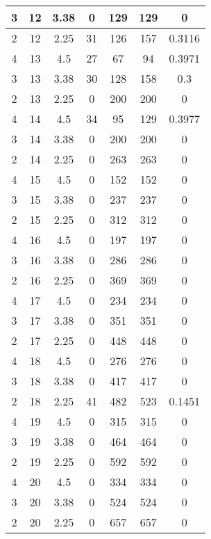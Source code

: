 \documentclass[letterpaper, 12pt]{article}
\begin{document}
\begin{longtable}{|c|c|c|c|c|c|c|}
\hline
3 & 12 & 3.38 & 0 & 129 & 129 & 0 \\
\hline
2 & 12 & 2.25 & 31 & 126 & 157 & 0.3116 \\
\hline
4 & 13 & 4.5 & 27 & 67 & 94 & 0.3971 \\
\hline
3 & 13 & 3.38 & 30 & 128 & 158 & 0.3 \\
\hline
2 & 13 & 2.25 & 0 & 200 & 200 & 0 \\
\hline
4 & 14 & 4.5 & 34 & 95 & 129 & 0.3977 \\
\hline
3 & 14 & 3.38 & 0 & 200 & 200 & 0 \\
\hline
2 & 14 & 2.25 & 0 & 263 & 263 & 0 \\
\hline
4 & 15 & 4.5 & 0 & 152 & 152 & 0 \\
\hline
3 & 15 & 3.38 & 0 & 237 & 237 & 0 \\
\hline
2 & 15 & 2.25 & 0 & 312 & 312 & 0 \\
\hline
4 & 16 & 4.5 & 0 & 197 & 197 & 0 \\
\hline
3 & 16 & 3.38 & 0 & 286 & 286 & 0 \\
\hline
2 & 16 & 2.25 & 0 & 369 & 369 & 0 \\
\hline
4 & 17 & 4.5 & 0 & 234 & 234 & 0 \\
\hline
3 & 17 & 3.38 & 0 & 351 & 351 & 0 \\
\hline
2 & 17 & 2.25 & 0 & 448 & 448 & 0 \\
\hline
4 & 18 & 4.5 & 0 & 276 & 276 & 0 \\
\hline
3 & 18 & 3.38 & 0 & 417 & 417 & 0 \\
\hline
2 & 18 & 2.25 & 41 & 482 & 523 & 0.1451 \\
\hline
4 & 19 & 4.5 & 0 & 315 & 315 & 0 \\
\hline
3 & 19 & 3.38 & 0 & 464 & 464 & 0 \\
\hline
2 & 19 & 2.25 & 0 & 592 & 592 & 0 \\
\hline
4 & 20 & 4.5 & 0 & 334 & 334 & 0 \\
\hline
3 & 20 & 3.38 & 0 & 524 & 524 & 0 \\
\hline
2 & 20 & 2.25 & 0 & 657 & 657 & 0 \\
\hline
\end{longtable}
\end{document}
